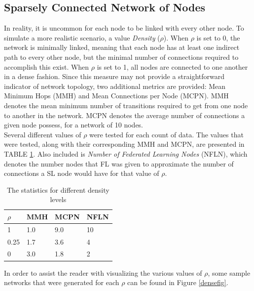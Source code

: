 \documentclass[letterpaper, 10 pt, conference]{ieeeconf}  %
\begin{document}
\subsection{Sparsely Connected Network of Nodes}
In reality, it is uncommon for each node to be linked with every other node. To simulate a more realistic scenario, a value \emph{Density} ($\rho$). When $\rho$ is set to 0, the network is minimally linked, meaning that each node has at least one indirect path to every other node, but the minimal number of connections required to accomplish this exist. When $\rho$ is set to 1, all nodes are connected to one another in a dense fashion. Since this measure may not provide a straightforward indicator of network topology, two additional metrics are provided:  Mean Minimum Hops (MMH) and Mean Connections per Node (MCPN). MMH denotes the mean minimum number of transitions required to get from one node to another in the network. MCPN denotes the average number of connections a given node possess, for a network of 10 nodes. \\

Several different values of $\rho$ were tested for each count of data. The values that were tested, along with their corresponding MMH and MCPN, are presented in TABLE \ref{sparsedensities}. Also included is \emph{Number of Federated Learning Nodes} (NFLN), which denotes the number nodes that FL was given to approximate the number of connections a SL node would have for that value of $\rho$.

\begin{table}[H]
	\centering
	\begin{tabular}{l|l|l|l}
		$\rho$ & MMH & MCPN & NFLN \\ \hline
		1 & 1.0 & 9.0 &  10\\
		0.25    & 1.7 & 3.6 & 4 \\
		0    & 3.0 & 1.8  & 2 \\
	\end{tabular}
	\caption{The statistics for different density levels} \label{sparsedensities}
\end{table}

In order to assist the reader with visualizing the various values of $\rho$, some sample networks that were generated for each $\rho$ can be found in Figure \ref{densefig}.
\end{document}
